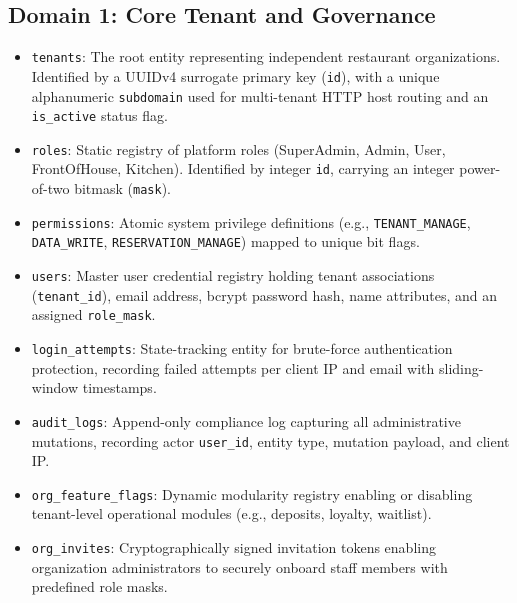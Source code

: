 \subsection{Domain 1: Core Tenant and Governance}
\begin{itemize}
    \item \texttt{tenants}: The root entity representing independent restaurant organizations. Identified by a UUIDv4 surrogate primary key (\texttt{id}), with a unique alphanumeric \texttt{subdomain} used for multi-tenant HTTP host routing and an \texttt{is\_active} status flag.
    \item \texttt{roles}: Static registry of platform roles (SuperAdmin, Admin, User, FrontOfHouse, Kitchen). Identified by integer \texttt{id}, carrying an integer power-of-two bitmask (\texttt{mask}).
    \item \texttt{permissions}: Atomic system privilege definitions (e.g., \texttt{TENANT\_MANAGE}, \texttt{DATA\_WRITE}, \texttt{RESERVATION\_MANAGE}) mapped to unique bit flags.
    \item \texttt{users}: Master user credential registry holding tenant associations (\texttt{tenant\_id}), email address, bcrypt password hash, name attributes, and an assigned \texttt{role\_mask}.
    \item \texttt{login\_attempts}: State-tracking entity for brute-force authentication protection, recording failed attempts per client IP and email with sliding-window timestamps.
    \item \texttt{audit\_logs}: Append-only compliance log capturing all administrative mutations, recording actor \texttt{user\_id}, entity type, mutation payload, and client IP.
    \item \texttt{org\_feature\_flags}: Dynamic modularity registry enabling or disabling tenant-level operational modules (e.g., deposits, loyalty, waitlist).
    \item \texttt{org\_invites}: Cryptographically signed invitation tokens enabling organization administrators to securely onboard staff members with predefined role masks.
\end{itemize}


